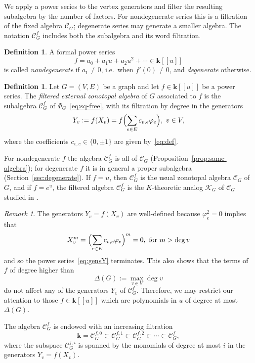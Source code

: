\documentclass[reqno]{article}
\theoremstyle{plain} %
\theoremstyle{definition}
\newtheorem{definition}[theorem]{Definition}
\theoremstyle{remark}
\newtheorem{remark}[theorem]{\sc Remark}
\newcommand{\K} {\mathbf{k}}
\newcommand {\CC}{\mathscr{C}}
\newcommand{\cK} {\mathscr{K}}
\numberwithin{equation}{section}
\begin{document}
We apply a power series to the vertex generators and filter the resulting
subalgebra by the number of factors. For nondegenerate series this is a
filtration of the fixed algebra $\CC_G$; degenerate series may generate
a smaller algebra. The notation $\CC_G^f$ includes both the subalgebra
and its word filtration.

\begin{definition}
  A formal power series
   \[f=a_0+a_1u+a_2u^2+\cdots \in \K[[u]] \]
is called  \emph{nondegenerate} if $a_1\ne 0$, i.e.\ when $f'(0)\ne 0$,
and \emph{degenerate} otherwise.
\end{definition}

\begin{definition}
  Let $G=(V,E)$ be a graph and let $f\in \K[[u]]$ be
  a power series.
The \emph{filtered external zonotopal algebra} of $G$ associated to $f$
is the subalgebra $\CC_G^f$ of $\Phi_G$~\eqref{eq:sq-free}, with its
filtration by degree in the generators
\begin{equation}
  \label{eq:gensY}
Y_v:=f(X_v)=f\Bigl(\sum_{e\in E} c_{v,e}\varphi_e\Bigr), \ v\in V,
\end{equation}
where the coefficients $c_{v,e}\in \{0,\pm 1\}$ are given by~\eqref{eq:def}.
\end{definition}
For nondegenerate $f$ the algebra $\CC^f_G$ is all of $\CC_G$
(Proposition~\ref{prop:same-algebra}); for degenerate $f$ it is in
general a proper subalgebra (Section~\ref{sec:degenerate}).
If $f=u$, then  $\CC^f_G$ is the usual zonotopal algebra  $\CC_G$ of $G$,  and if  $f=e^u$,  the filtered algebra $\CC^f_G$  is the $K$-theoretic analog $\cK_G$ of $\CC_G$ studied in \cite{NSh}.
\begin{remark}
\label{rem:nilpot}
The generators  $Y_v=f(X_v)$ are well-defined because $\varphi_e^2=0$ implies that
\begin{equation}
  \label{eq:nilpot}
  X_v^m=\Bigl( \sum_{e\in E} c_{v,e}\varphi_e \Bigr)^m=0,  \text{ for } m>\deg v
\end{equation}
   and so the power series~\eqref{eq:gensY} terminates.
   This also shows that the terms of $f$ of degree higher than
   \[ \Delta(G):=\max_{v\in V}\deg v
   \]
do not affect any of the generators $Y_v$ of $\CC_G^f$.
%
Therefore, we may restrict our attention to those $f\in \K[[u]]$ which are polynomials in $u$ of degree at most $\Delta(G)$.
\end{remark}


The algebra $\CC^f_G$ is endowed with an increasing filtration
\begin{equation}
  \label{eq:filtration}
\K=\CC^{f,0}_G\subset\CC^{f,1}_G\subset\CC^{f,2}_G\subset\cdots \subset \CC^f_G,
\end{equation}
where the subspace $\CC^{f,i}_G$ is spanned by the monomials of degree at most $i$ in the generators $Y_v=f(X_v)$.
\end{document}
